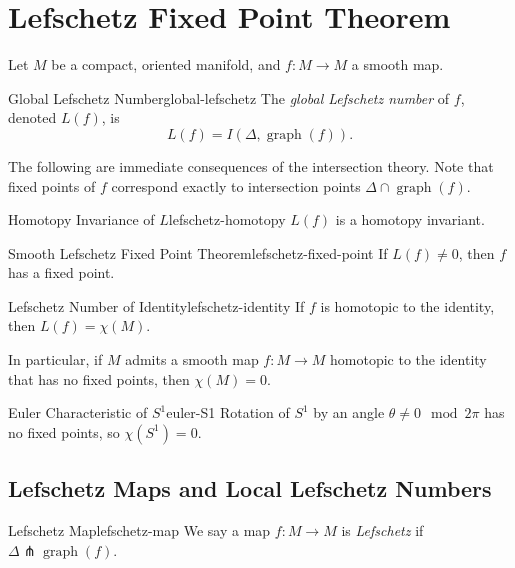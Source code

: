 
\section{Lefschetz Fixed Point Theorem}

Let $M$ be a compact, oriented manifold, and $f \colon M \to M$ a smooth map.

\begin{definition}{Global Lefschetz Number}{global-lefschetz}
    The \emph{global Lefschetz number} of $f$, denoted $L(f)$, is
    \[
        L(f) = I(\Delta, \operatorname{graph}(f)).
    \]
\end{definition}

The following are immediate consequences of the intersection theory. Note that fixed points of $f$ correspond exactly to intersection points $\Delta \cap \operatorname{graph}(f)$.

\begin{proposition}{Homotopy Invariance of $L$}{lefschetz-homotopy}
    $L(f)$ is a homotopy invariant.
\end{proposition}

\begin{theorem}{Smooth Lefschetz Fixed Point Theorem}{lefschetz-fixed-point}
    If $L(f) \neq 0$, then $f$ has a fixed point.
\end{theorem}

\begin{proposition}{Lefschetz Number of Identity}{lefschetz-identity}
    If $f$ is homotopic to the identity, then $L(f) = \chi(M)$.
\end{proposition}

In particular, if $M$ admits a smooth map $f \colon M \to M$ homotopic to the identity that has no fixed points, then $\chi(M) = 0$.

\begin{example}{Euler Characteristic of $S^1$}{euler-S1}
    Rotation of $S^1$ by an angle $\theta \neq 0 \mod 2\pi$ has no fixed points, so $\chi(S^1) = 0$.
\end{example}

\subsection{Lefschetz Maps and Local Lefschetz Numbers}

\begin{definition}{Lefschetz Map}{lefschetz-map}
    We say a map $f \colon M \to M$ is \emph{Lefschetz} if $\Delta \pitchfork \operatorname{graph}(f)$.
\end{definition}

